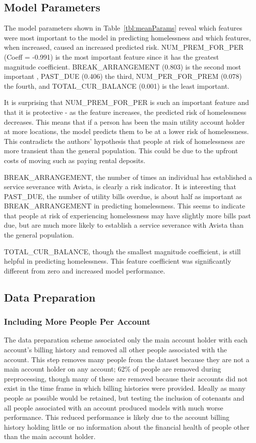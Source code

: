 \documentclass[10pt,letterpaper]{article}
\begin{document}
\subsection*{Model Parameters}
The model parameters shown in Table~\ref{tbl:meanParams} reveal which features were most important to the model in predicting homelessness and which features, when increased, caused an increased predicted risk. NUM\_PREM\_FOR\_PER (Coeff = -0.991) is the most important feature since it has the greatest magnitude coefficient. BREAK\_ARRANGEMENT (0.803) is the second most important , PAST\_DUE (0.406) the third, NUM\_PER\_FOR\_PREM (0.078) the fourth, and TOTAL\_CUR\_BALANCE (0.001) is the least important.

It is surprising that NUM\_PREM\_FOR\_PER is such an important feature and that it is protective - as the feature increases, the predicted risk of homelessness decreases. This means that if a person has been the main utility account holder at more locations, the model predicts them to be at a lower risk of homelessness. This contradicts the authors' hypothesis that people at risk of homelessness are more transient than the general population. This could be due to the upfront costs of moving such as paying rental deposits.

BREAK\_ARRANGEMENT, the number of times an individual has established a service severance with Avista, is clearly a risk indicator. It is interesting that PAST\_DUE, the number of utility bills overdue, is about half as important as BREAK\_ARRANGEMENT in predicting homelessness. This seems to indicate that people at risk of experiencing homelessness may have slightly more bills past due, but are much more likely to establish a service severance with Avista than the general population. 

TOTAL\_CUR\_BALANCE, though the smallest magnitude coefficient, is still helpful in predicting homelessness. This feature coefficient was significantly different from zero and increased model performance.

\subsection*{Data Preparation}
\subsubsection*{Including More People Per Account}
The data preparation scheme associated only the main account holder with each account's billing history and removed all other people associated with the account. This step removes many people from the dataset because they are not a main account holder on any account; 62\% of people are removed during preprocessing, though many of these are removed because their accounts did not exist in the time frame in which billing histories were provided. Ideally as many people as possible would be retained, but testing the inclusion of cotenants and all people associated with an account produced models with much worse performance. This reduced performance is likely due to the account billing history holding little or no information about the financial health of people other than the main account holder.
\end{document}
